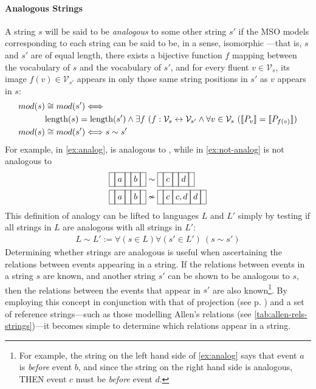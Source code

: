 \documentclass[a4paper,12pt,leqno]{article}
\newcommand{\vph}[1]{\vphantom{#1}}
\newcommand{\ebox}[1]{\fbox{$\vph{'(),}#1$}}
\newcommand{\nbBefore}[2]{\ebox{#1}\ebox{}\ebox{#2}}
\newcommand{\nbOverlaps}[2]{\ebox{#1}\ebox{#1,#2}\ebox{#2}}
\newcommand{\Before}[2]{\ebox{}\nbBefore{#1}{#2}\ebox{}}
\newcommand{\Overlaps}[2]{\ebox{}\nbOverlaps{#1}{#2}\ebox{}}
\newcommand{\V}{\mathcal{V}}
\newcommand{\nb}[1]{{\color{red}[NB\footnote{{\color{red}#1}}]}}
\begin{document}
\paragraph{Analogous Strings}\label{para:analogous-strings}
A string $s$ will be said to be \textit{analogous} to some other string $s'$ if the MSO models corresponding to each string can be said to be, in a sense, isomorphic%
---that is, $s$ and $s'$ are of equal length, there exists a bijective function $f$ mapping between the vocabulary of $s$ and the vocabulary of $s'$, and for every fluent $v \in \V_s$, its image $f(v) \in \V_{s'}$ appears in only those same string positions in $s'$ as $v$ appears in $s$:
\begin{align}
	mod(s) &\cong mod(s') \Longleftrightarrow \\\notag &\text{length}(s) = \text{length}(s') \land \exists f ~(f: \V_s \leftrightarrow \V_{s'} \land \forall v \in \V_s ~(\llbracket P_v \rrbracket = \llbracket P_{f(v)} \rrbracket)\\
	mod(s) &\cong mod(s') \Longleftrightarrow s \sim s'
\end{align}
For example, in \cref{ex:analog}, \Before{a}{b} is analogous to \Before{c}{d}, while in \cref{ex:not-analog} \Before{a}{b} is not analogous to \Overlaps{c}{d}
\begin{align}
	\Before{a}{b} &\sim \Before{c}{d}\label{ex:analog}\\
	\Before{a}{b} &\nsim \Overlaps{c}{d}\label{ex:not-analog}
\end{align}
This definition of analogy can be lifted to languages $L$ and $L'$ simply by testing if all strings in $L$ are analogous with all strings in $L'$:
\begin{align}
	L \sim L' := \forall (s \in L) \forall (s' \in L')~ (s \sim s')
\end{align}
Determining whether strings are analogous is useful when ascertaining the relations between events appearing in a string. If the relations between events in a string $s$ are known, and another string $s'$ can be shown to be analogous to $s$, then the relations between the events that appear in $s'$ are also known\footnote{For example, the string on the left hand side of \cref{ex:analog} says that event $a$ is \textit{before} event $b$, and since the string on the right hand side is analogous, THEN event $c$ must be \textit{before} event $d$.}. By employing this concept in conjunction with that of projection (see p. \pageref{para:str-op-projection}) and a set of reference strings---such as those modelling Allen's relations (see \cref{tab:allen-rels-strings})---it becomes simple to determine which relations appear in a string.
\end{document}
